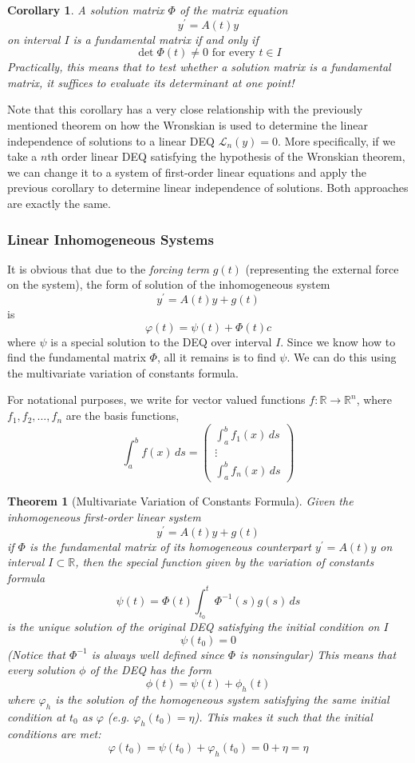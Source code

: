 \documentclass{article}
\newtheorem{theorem}{Theorem}[section]
\newtheorem{corollary}{Corollary}[theorem]
\theoremstyle{remark}
\theoremstyle{definition}
\begin{document}
\begin{corollary}
A solution matrix $\Phi$ of the matrix equation 
\[y^\prime = A(t) y\]
on interval $I$ is a fundamental matrix if and only if 
\[\det{\Phi(t)} \neq 0 \text{ for every } t \in I\]
Practically, this means that to test whether a solution matrix is a fundamental matrix, it suffices to evaluate its determinant at one point! 
\end{corollary}

Note that this corollary has a very close relationship with the previously mentioned theorem on how the Wronskian is used to determine the linear independence of solutions to a linear DEQ $\mathcal{L}_n (y) = 0$. More specifically, if we take a $n$th order linear DEQ satisfying the hypothesis of the Wronskian theorem, we can change it to a system of first-order linear equations and apply the previous corollary to determine linear independence of solutions. Both approaches are exactly the same. 

\subsubsection{Linear Inhomogeneous Systems}
It is obvious that due to the \textit{forcing term} $g(t)$ (representing the external force on the system), the form of solution of the inhomogeneous system 
\[y^\prime = A(t) y + g(t)\]
is 
\[\varphi(t) = \psi(t) + \Phi(t) c\]
where $\psi$ is a special solution to the DEQ over interval $I$. Since we know how to find the fundamental matrix $\Phi$, all it remains is to find $\psi$. We can do this using the multivariate variation of constants formula. 

For notational purposes, we write for vector valued functions $f: \mathbb{R} \longrightarrow \mathbb{R}^n$, where $f_1, f_2, \ldots, f_n$ are the basis functions, 
\[\int_a^b f(x)\,ds = \begin{pmatrix}
\int_a^b f_1 (x)\,ds \\ \vdots \\ \int_a^b f_n(x)\,ds
\end{pmatrix}\]

\begin{theorem}[Multivariate Variation of Constants Formula]
Given the inhomogeneous first-order linear system 
\[y^\prime = A(t) y + g(t)\]
if $\Phi$ is the fundamental matrix of its homogeneous counterpart $y^\prime = A(t) y$ on interval $I \subset \mathbb{R}$, then the special function given by the variation of constants formula 
\[\psi (t) = \Phi (t) \int_{t_0}^t \Phi^{-1} (s) g(s) \,ds\]
is the unique solution of the original DEQ satisfying the initial condition on $I$
\[\psi (t_0) = 0\]
(Notice that $\Phi^{-1}$ is always well defined since $\Phi$ is nonsingular) This means that every solution $\phi$ of the DEQ has the form 
\[\phi(t) = \psi (t) + \phi_h (t)\]
where $\varphi_h$ is the solution of the homogeneous system satisfying the same initial condition at $t_0$ as $\varphi$ (e.g. $\varphi_h (t_0) = \eta$). This makes it such that the initial conditions are met: 
\[\varphi(t_0) = \psi(t_0) + \varphi_h (t_0) = 0 + \eta = \eta\]
\end{theorem}
\end{document}
